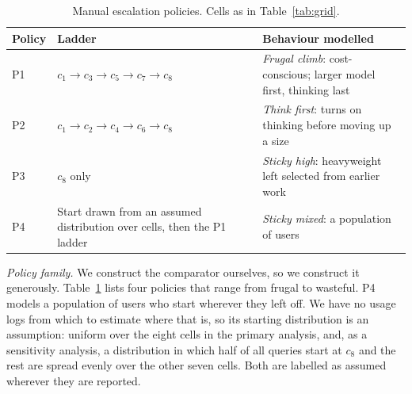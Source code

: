 \begin{table}[!t]
\centering
\caption{Manual escalation policies. Cells as in Table~\ref{tab:grid}.}
\label{tab:policies}
\renewcommand{\arraystretch}{1.1}
\small
\begin{tabularx}{\columnwidth}{@{}l >{\raggedright\arraybackslash}p{2.9cm} >{\raggedright\arraybackslash}X@{}}
\toprule
Policy & Ladder & Behaviour modelled \\
\midrule
P1 & $c_1{\to}c_3{\to}c_5{\to}c_7{\to}c_8$ & \emph{Frugal climb}: cost-conscious; larger model first, thinking last \\
P2 & $c_1{\to}c_2{\to}c_4{\to}c_6{\to}c_8$ & \emph{Think first}: turns on thinking before moving up a size \\
P3 & $c_8$ only & \emph{Sticky high}: heavyweight left selected from earlier work \\
P4 & Start drawn from an assumed distribution over cells, then the P1 ladder & \emph{Sticky mixed}: a population of users \\
\bottomrule
\end{tabularx}
\end{table}

\emph{Policy family.} We construct the comparator ourselves, so we
construct it generously. Table~\ref{tab:policies} lists four policies that
range from frugal to wasteful. P4 models a population of users who start
wherever they left off. We have no usage logs from which to estimate where
that is, so its starting distribution is an assumption: uniform over the
eight cells in the primary analysis, and, as a sensitivity analysis, a
distribution in which half of all queries start at $c_8$ and the rest are
spread evenly over the other seven cells. Both are labelled as assumed
wherever they are reported.

